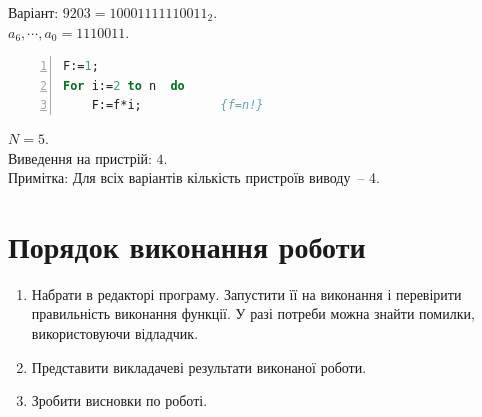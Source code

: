 \documentclass[a4paper, 10pt]{article}
\begin{document}
\noindent
Варіант: $9203=10001111110011_2.$\\
$a_{6},\cdots,a_{0}=1110011.$\\
\begin{lstlisting}[numbers=left, language=pascal]
F:=1;
For i:=2 to n  do
    F:=f*i;           {f=n!}
\end{lstlisting}
$N = 5.$\\
Виведення на пристрій: $4.$\\
Примітка: Для всіх варіантів кількість пристроїв виводу~-- 4.\\

\section{Порядок виконання роботи}
\begin{enumerate}
    \item Набрати в редакторі програму. Запустити її на виконання і перевірити правильність виконання функції. У разі потреби можна знайти помилки, використовуючи відладчик.
    \item Представити викладачеві результати виконаної роботи.
	\item Зробити висновки по роботі.
\end{enumerate}
\end{document}
